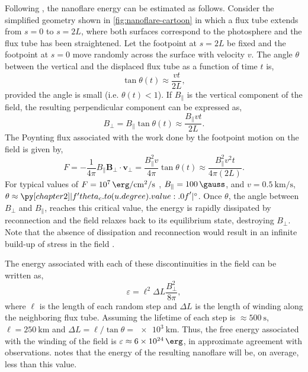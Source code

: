 Following \citet{parker_nanoflares_1988}, the nanoflare energy can be estimated as follows. Consider the simplified geometry shown in \autoref{fig:nanoflare-cartoon} in which a flux tube extends from $s=0$ to $s=2L$, where both surfaces correspond to the photosphere and the flux tube has been straightened. Let the footpoint at $s=2L$ be fixed and the footpoint at $s=0$ move randomly across the surface with velocity $v$. The angle $\theta$ between the vertical and the displaced flux tube as a function of time $t$ is,
\begin{equation}
    \tan{\theta(t)} \approx \frac{vt}{2L},
\end{equation}
provided the angle is small (i.e. $\theta(t)<1$). If $B_\parallel$ is the vertical component of the field, the resulting perpendicular component can be expressed as,
\begin{equation}
    B_\perp = B_\parallel\tan{\theta(t)} \approx \frac{B_\parallel vt}{2L}.
\end{equation}
The Poynting flux associated with the work done by the footpoint motion on the field is given by,
\begin{equation}
    F = -\frac{1}{4\pi}B_\parallel\mathbf{B}_\perp\cdot\mathbf{v}_\perp = \frac{B_\parallel^2 v}{4\pi}\tan{\theta(t)} \approx \frac{B_\parallel^2 v^2 t}{4\pi(2L)}.
\end{equation}
For typical \AR{} values of $F=\SI{e7}{\erg\per\square\cm\per\second}$ \citep{withbroe_mass_1977}, $B_\parallel=\SI{100}{\gauss}$, and $v=\SI{0.5}{\km\per\second}$, $\theta\approx\py[chapter2]|f'{theta_c.to(u.degree).value:.0f}'|\si{\degree}$. Once $\theta$, the angle between $B_\perp$ and $B_\parallel$, reaches this critical value, the energy is rapidly dissipated by reconnection and the field relaxes back to its equilibrium state, destroying $B_\perp$. Note that the absence of dissipation and reconnection would result in an infinite build-up of stress in the field \citep{klimchuk_key_2015}.

The energy associated with each of these discontinuities in the field can be written as,
\begin{equation}
    \varepsilon = \ell^2\Delta L \frac{B_\perp^2}{8\pi},
\end{equation}
where $\ell$ is the length of each random step and $\Delta L$ is the length of winding along the neighboring flux tube. Assuming the lifetime of each step is $\approx\SI{500}{\second}$, $\ell=\SI{250}{\km}$ and $\Delta L=\ell/\tan{\theta}=\SI{e3}{\km}$. Thus, the free energy associated with the winding of the field is $\varepsilon\approx\SI{6e24}{\erg}$, in approximate agreement with observations. \citet{parker_nanoflares_1988} notes that the energy of the resulting nanoflare will be, on average, less than this value.

